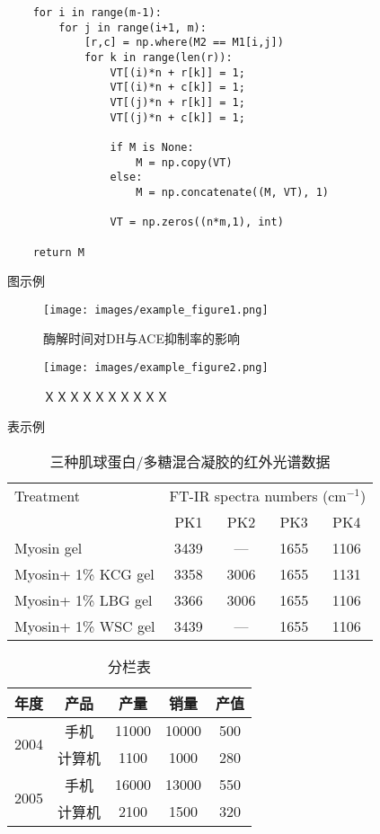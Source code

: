 \documentclass[a4paper]{ltxdoc}
\numberwithin{equation}{section}
\begin{document}
{\begin{verbatim}
    for i in range(m-1):
        for j in range(i+1, m):
            [r,c] = np.where(M2 == M1[i,j])
            for k in range(len(r)):
                VT[(i)*n + r[k]] = 1;
                VT[(i)*n + c[k]] = 1;
                VT[(j)*n + r[k]] = 1;
                VT[(j)*n + c[k]] = 1;

                if M is None:
                    M = np.copy(VT)
                else:
                    M = np.concatenate((M, VT), 1)

                VT = np.zeros((n*m,1), int)

    return M
\end{verbatim}


图示例
\begin{figure}[!htb]
	\centering
	\texttt{[image: images/example\_figure1.png]}
	\caption{酶解时间对DH与ACE抑制率的影响}
\end{figure}

\begin{figure}[!htb]
	\centering
	\texttt{[image: images/example\_figure2.png]}
	\caption{ＸＸＸＸＸＸＸＸＸＸ}
\end{figure}

\clearpage
表示例
\begin{table}[!htb]
\centering
\caption{三种肌球蛋白/多糖混合凝胶的红外光谱数据}
\begin{tabular}{lcccc}
\hline
Treatment           & \multicolumn{4}{c}{FT-IR spectra numbers (cm$^{−1}$)} \\ \cline{2-5} 
                    & PK1        & PK2        & PK3        & PK4       \\ \hline
Myosin gel          & 3439       & —          & 1655       & 1106      \\
Myosin+ 1\% KCG gel & 3358       & 3006       & 1655       & 1131      \\
Myosin+ 1\% LBG gel & 3366       & 3006       & 1655       & 1106      \\
Myosin+ 1\% WSC gel & 3439       & —          & 1655       & 1106      \\ \hline
\end{tabular}
\end{table}

\begin{table}[!htb]
\centering
\caption{分栏表}
\begin{tabular}{ccccc}
\hline
年度                    & 产品  & 产量    & 销量    & 产值  \\ \hline
\multirow{2}{*}{2004} & 手机  & 11000 & 10000 & 500 \\
                      & 计算机 & 1100  & 1000  & 280 \\ \hline
\multirow{2}{*}{2005} & 手机  & 16000 & 13000 & 550 \\
                      & 计算机 & 2100  & 1500  & 320 \\ \hline
\end{tabular}
\end{table}
}
\end{document}
